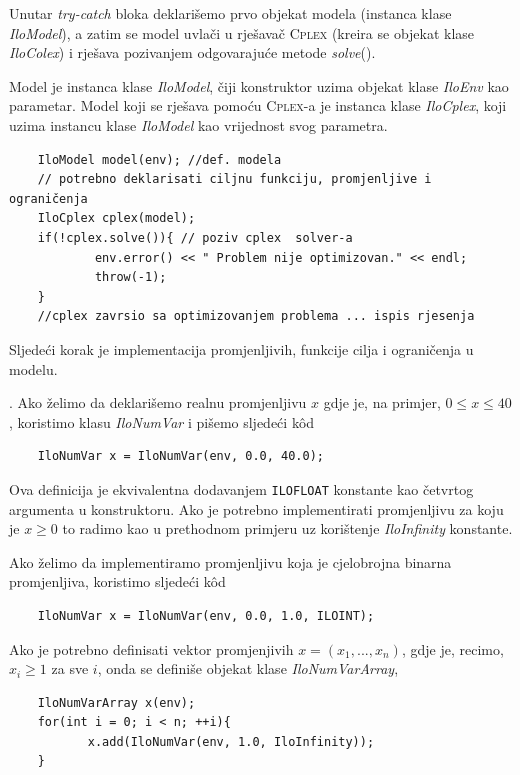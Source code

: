 \documentclass[a4paper, utf8, 11pt, colorlinks]{book}
\theoremstyle{definition}
\begin{document}
 \noindent Unutar \emph{try-catch} bloka deklarišemo prvo objekat modela (instanca klase \emph{IloModel}), a zatim se model uvlači u rješavač \textsc{Cplex} (kreira se objekat klase \emph{IloColex}) i rješava pozivanjem odgovarajuće metode \emph{solve}().
 
 Model je instanca klase \emph{IloModel}, čiji konstruktor uzima objekat klase \emph{IloEnv} kao parametar. Model koji se rješava pomoću \textsc{Cplex}-a je instanca klase \emph{IloCplex}, koji uzima instancu klase \emph{IloModel} kao vrijednost svog parametra.  
   
 

 \begin{verbatim}
 	IloModel model(env); //def. modela
 	// potrebno deklarisati ciljnu funkciju, promjenljive i ograničenja
 	IloCplex cplex(model);
 	if(!cplex.solve()){ // poziv cplex  solver-a
 		    env.error() << " Problem nije optimizovan." << endl;
 		    throw(-1);
 	}
 	//cplex zavrsio sa optimizovanjem problema ... ispis rjesenja
 \end{verbatim}
 
 \noindent Sljedeći korak je implementacija promjenljivih, funkcije cilja i ograničenja u modelu. 
 
 . Ako želimo da deklarišemo realnu promjenljivu $x$ gdje je, na primjer, $0 \leq x \leq 40$, koristimo klasu \emph{IloNumVar} i pišemo sljedeći k\^od
 \begin{verbatim}
 	IloNumVar x = IloNumVar(env, 0.0, 40.0);
 \end{verbatim}
 Ova definicija je ekvivalentna dodavanjem  \texttt{ILOFLOAT} konstante kao četvrtog argumenta u  konstruktoru. 
Ako je potrebno implementirati promjenljivu za koju je $x \geq 0$ to radimo kao u prethodnom primjeru uz korištenje  \emph{IloInfinity} konstante.
 
 Ako želimo da implementiramo promjenljivu koja je cjelobrojna binarna promjenljiva, koristimo sljedeći k\^od
 \begin{verbatim}
 	IloNumVar x = IloNumVar(env, 0.0, 1.0, ILOINT);
 \end{verbatim}
 \noindent Ako je potrebno definisati vektor promjenjivih $x=(x_1,...,x_n)$, gdje je, recimo, $x_i \geq 1$ za sve $i$, onda se definiše objekat klase \emph{IloNumVarArray},
 \begin{verbatim}
 	IloNumVarArray x(env);
 	for(int i = 0; i < n; ++i){
 		   x.add(IloNumVar(env, 1.0, IloInfinity));
 	}
 \end{verbatim}
 
\end{document}
